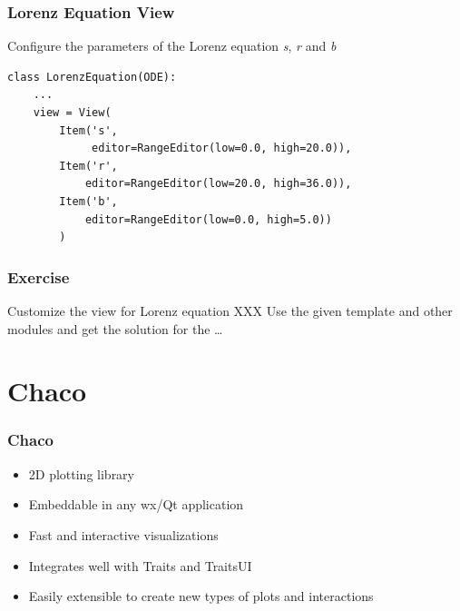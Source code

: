 \documentclass[14pt,compress]{beamer}
\begin{document}
\begin{frame}
\frametitle{Lorenz Equation View}
Configure the parameters of the Lorenz equation \emph{s}, \emph{r} and \emph{b}
\footnotesize
\begin{lstlisting}
class LorenzEquation(ODE):
    ...
    view = View(
        Item('s', 
             editor=RangeEditor(low=0.0, high=20.0)),
        Item('r', 
            editor=RangeEditor(low=20.0, high=36.0)),
        Item('b', 
            editor=RangeEditor(low=0.0, high=5.0))
        )
\end{lstlisting}
\end{frame}


\begin{frame}[plain]
    \frametitle{Exercise}
  \begin{block}{Customize the view for Lorenz equation}
      XXX
      Use the given template and other modules and get the
      solution for the \ldots
  \end{block}
\end{frame}


\section{Chaco}

\begin{frame}
  \frametitle{Chaco}
  \begin{itemize}
      \item 2D plotting library
      \item Embeddable in any wx/Qt application
      \item Fast and interactive visualizations
      \item Integrates well with Traits and TraitsUI
      \item Easily extensible to create new types of plots and interactions
  \end{itemize}
\end{frame}
\end{document}
